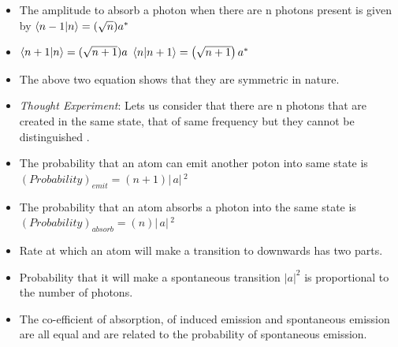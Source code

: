 \documentclass[aspectratio=169]{beamer}
\begin{document}
\begin{frame}
	\begin{itemize}
		\item The amplitude to absorb a photon when there are n photons present is given by \pause \newline
		$\braket{n-1|n} = (\sqrt{n})a^{*}$ \pause \newline
		\item  $\braket{n+1|n}=(\sqrt{n+1})a$\pause \newline
		$\braket{n|n+1}=\left(\sqrt{n+1}\right)a^{*}$ \pause \newline
		\item The above two equation shows that they are symmetric in nature.
	\end{itemize}
\end{frame}

\begin{frame}
	\begin{itemize}
		\item \textit{Thought Experiment}: Lets us consider that there are n photons that are created in the same state, that of same frequency but they cannot be distinguished .\pause \newline
		\item The probability that an atom can emit another poton into same state is \pause \newline
		$(Probability)_{emit} = (n+1)\rvert\,a \rvert\,^{2}$  \pause \newline
		\item The probability that an atom absorbs a photon into the same state is \pause \newline
		$(Probability)_{absorb} = (n)\rvert\, a\rvert\,^{2}$
	\end{itemize}
\end{frame}

\begin{frame}
	\begin{itemize}
		\item Rate at which an atom will make a transition to downwards has two parts.\pause \newline
		\item Probability that it will make a spontaneous transition $\rvert a \rvert^{2}$  is proportional to the number of photons. \pause \newline
		\item The co-efficient of absorption, of induced emission and spontaneous emission are all equal and are related to the probability of spontaneous emission.
	\end{itemize}
\end{frame}
\end{document}
